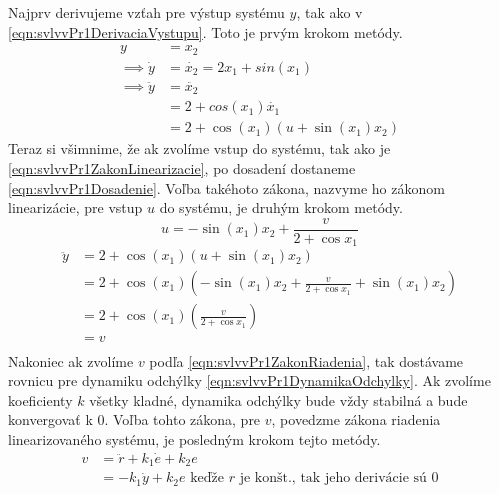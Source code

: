 \documentclass[../main.tex]{subfiles}
\begin{document}
	Najprv derivujeme vzťah pre výstup systému $y$, tak ako v \cref{eqn:svlvvPr1DerivaciaVystupu}. Toto je prvým krokom metódy.
	\begin{equation}
	\begin{aligned}
		y &= x_2 \\ 
		\implies \dot{y}  &= \dot{x_2} =  2x_1 + sin(x_1) \\
		\implies \ddot{y} &= \ddot{x_2} \\
						  &= 2 + cos(x_1)\dot{x_1} \\
						  &= 2 + \cos(x_1)(u + \sin(x_1) x_2)
		\end{aligned}
		\label{eqn:svlvvPr1DerivaciaVystupu}
	\end{equation}
	Teraz si všimnime, že ak zvolíme vstup do systému, tak ako je \cref{eqn:svlvvPr1ZakonLinearizacie}, po dosadení dostaneme \cref{eqn:svlvvPr1Dosadenie}. Voľba takéhoto zákona, nazvyme ho zákonom linearizácie, pre vstup $u$ do systému, je druhým krokom metódy.
	\begin{equation}
	 u = -\sin(x_1) x_2  +  \frac{v}{2 + \cos x_1}
	 \label{eqn:svlvvPr1ZakonLinearizacie}
	\end{equation}
	\begin{equation}
	\begin{aligned}
	 	\ddot{y} &= 2 + \cos(x_1)(u + \sin(x_1) x_2) \\
	 		     &= 2 + \cos(x_1)(-\sin(x_1) x_2  +  \frac{v}{2 + \cos x_1} + \sin(x_1) x_2)  \\ 
	 		     &= 2 + \cos(x_1)(\frac{v}{2 + \cos x_1})  \\ 
	 		     &= v  \\ 
 	\end{aligned}
	\label{eqn:svlvvPr1Dosadenie}
	\end{equation}
	Nakoniec ak zvolíme $v$ podľa \cref{eqn:svlvvPr1ZakonRiadenia}, tak dostávame rovnicu pre dynamiku odchýlky \cref{eqn:svlvvPr1DynamikaOdchylky}. Ak zvolíme koeficienty $k$ všetky kladné, dynamika odchýlky bude vždy stabilná a bude konvergovať k 0. Voľba tohto zákona, pre $v$, povedzme zákona riadenia linearizovaného systému, je posledným krokom tejto metódy.
	\begin{equation}
	\begin{aligned}
	 v &= \ddot{r}  +k_1 \dot{e} + k_2 e \\
	   &= -k_1 \dot{y} + k_2 e \text{ keďže $r$ je konšt., tak jeho derivácie sú 0}\\
	   \end{aligned}
	\label{eqn:svlvvPr1ZakonRiadenia}
	\end{equation}
\end{document}
